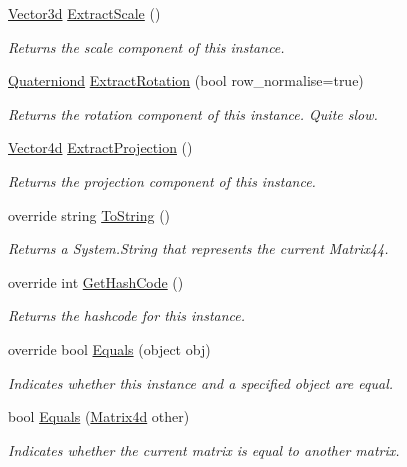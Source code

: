 \begin{DoxyCompactItemize}
\hyperlink{struct_open_t_k_1_1_vector3d}{Vector3d} \hyperlink{struct_open_t_k_1_1_matrix4d_a60d643e715572875c395d160975eb61d}{Extract\-Scale} ()
\begin{DoxyCompactList}\small\item\em Returns the scale component of this instance. \end{DoxyCompactList}\item 
\hyperlink{struct_open_t_k_1_1_quaterniond}{Quaterniond} \hyperlink{struct_open_t_k_1_1_matrix4d_a71b5e78f37a4567d54785f5b7eb402d3}{Extract\-Rotation} (bool row\-\_\-normalise=true)
\begin{DoxyCompactList}\small\item\em Returns the rotation component of this instance. Quite slow. \end{DoxyCompactList}\item 
\hyperlink{struct_open_t_k_1_1_vector4d}{Vector4d} \hyperlink{struct_open_t_k_1_1_matrix4d_aafd290abcca656f9b46ee10adde6b5fe}{Extract\-Projection} ()
\begin{DoxyCompactList}\small\item\em Returns the projection component of this instance. \end{DoxyCompactList}\item 
override string \hyperlink{struct_open_t_k_1_1_matrix4d_a08a691e64a2f31285c7738d5c6878aa4}{To\-String} ()
\begin{DoxyCompactList}\small\item\em Returns a System.\-String that represents the current Matrix44. \end{DoxyCompactList}\item 
override int \hyperlink{struct_open_t_k_1_1_matrix4d_a86195857463a8bdf394653cfcc48eb87}{Get\-Hash\-Code} ()
\begin{DoxyCompactList}\small\item\em Returns the hashcode for this instance. \end{DoxyCompactList}\item 
override bool \hyperlink{struct_open_t_k_1_1_matrix4d_ae77d868708aa0a83affbff85200a36b2}{Equals} (object obj)
\begin{DoxyCompactList}\small\item\em Indicates whether this instance and a specified object are equal. \end{DoxyCompactList}\item 
bool \hyperlink{struct_open_t_k_1_1_matrix4d_a1b342fe1efebd7b213d4e50e25a08364}{Equals} (\hyperlink{struct_open_t_k_1_1_matrix4d}{Matrix4d} other)
\begin{DoxyCompactList}\small\item\em Indicates whether the current matrix is equal to another matrix.\end{DoxyCompactList}\end{DoxyCompactItemize}
